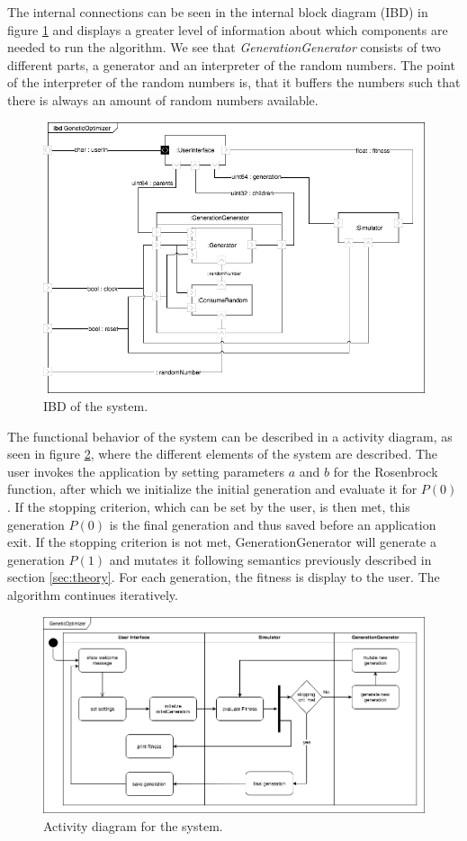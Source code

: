 The internal connections can be seen in the internal block diagram (IBD) in figure \ref{fig:ibd} and displays a greater level of information about which components are needed to run the algorithm. We see that \emph{GenerationGenerator} consists of two different parts, a generator and an interpreter of the random numbers. The point of the interpreter of the random numbers is, that it buffers the numbers such that there is always an amount of random numbers available.

\begin{figure}[h]
	\centering
	\includegraphics[width=\linewidth]{../diagrams/ibd.png}
	\caption{IBD of the system.}
	\label{fig:ibd}
\end{figure}

The functional behavior of the system can be described in a activity diagram, as seen in figure \ref{fig:activity}, where the different elements of the system are described. The user invokes the application by setting parameters $a$ and $b$ for the Rosenbrock function, after which we initialize the initial generation and evaluate it for $P(0)$. If the stopping criterion, which can be set by the user, is then met, this generation $P(0)$ is the final generation and thus saved before an application exit. If the stopping criterion is not met, GenerationGenerator will generate a generation $P(1)$ and mutates it following semantics previously described in section \ref{sec:theory}. For each generation, the fitness is display to the user. The algorithm continues iteratively.

\begin{figure}[h]
	\centering
	\includegraphics[width=0.9\linewidth]{../diagrams/overallActivity.png}
	\caption{Activity diagram for the system.}
	\label{fig:activity}
\end{figure}

